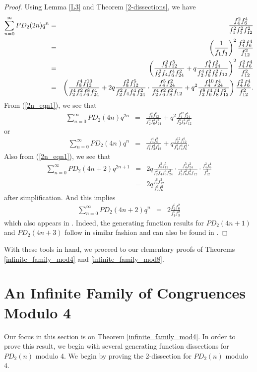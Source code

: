 \documentclass{amsart}
\begin{document}
\begin{proof}
Using Lemma \ref{L3} and Theorem \ref{2-dissections},  we have 
\begin{eqnarray}
\sum_{n=0}^{\infty} PD_2(2n)q^n
&=& 
\frac{f_4^2f_6^4}{f_1^2f_3^2f_{12}^2} \notag \\
&=& 
\left( \frac{1}{f_1f_3} \right)^2 \frac{f_4^2f_6^4}{f_{12}^2} \notag \\
&=& 
\left( \frac{f_8^2f_{12}^5}{f_2^2f_4f_6^4f_{24}^2} + q \frac{f_4^5f_{24}^2}{f_2^4f_6^2f_8^2f_{12}} \right)^2 \frac{f_4^2f_6^4}{f_{12}^2} \notag \\
&=& 
\left( \frac{f_8^4f_{12}^{10}}{f_2^4f_4^2f_6^8f_{24}^4} + 2q \frac{f_8^2f_{12}^5}{f_2^2f_4f_6^4f_{24}^2}\cdot \frac{f_4^5f_{24}^2}{f_2^4f_6^2f_8^2f_{12}} + q^2\frac{f_4^{10}f_{24}^4}{f_2^8f_6^4f_8^4f_{12}^2}\right) \frac{f_4^2f_6^4}{f_{12}^2}. \label{2n_eqn1} 
\end{eqnarray}
From (\ref{2n_eqn1}), we see that 
\begin{eqnarray*}
\sum_{n=0}^{\infty} PD_2(4n)q^{2n}
&=& 
 \frac{f_8^4f_{12}^{8}}{f_2^4f_6^4f_{24}^4}  + q^2\frac{f_4^{12}f_{24}^4}{f_2^8f_8^4f_{12}^4}
\end{eqnarray*}
or 
\begin{eqnarray*}
\sum_{n=0}^{\infty} PD_2(4n)q^{n}
&=& 
 \frac{f_4^4f_{6}^{8}}{f_1^4f_3^4f_{12}^4}  + q\frac{f_2^{12}f_{12}^4}{f_1^8f_4^4f_{6}^4}.
\end{eqnarray*}
Also from (\ref{2n_eqn1}), we see that 
\begin{eqnarray*}
\sum_{n=0}^{\infty} PD_2(4n+2)q^{2n+1}
&=& 
2q \frac{f_8^2f_{12}^5}{f_2^2f_4f_6^4f_{24}^2}\cdot \frac{f_4^5f_{24}^2}{f_2^4f_6^2f_8^2f_{12}}  \cdot \frac{f_4^2f_6^4}{f_{12}^2} \\
&=& 
2q \frac{f_4^6f_{12}^2}{f_2^6f_6^2}
\end{eqnarray*}
after simplification.  And this implies 
\begin{eqnarray*}
\sum_{n=0}^{\infty} PD_2(4n+2)q^{n}
&=& 
2\frac{f_2^6f_{6}^2}{f_1^6f_3^2}
\end{eqnarray*}
which also appears in \cite[Theorem 1.3]{BO}.  Indeed, the generating function results for $PD_2(4n+1)$ and $PD_2(4n+3)$ follow in similar fashion and can also be found in \cite[Theorem 1.3]{BO}.
\end{proof}
With these tools in hand, we proceed to our elementary proofs of Theorems \ref{infinite_family_mod4} and \ref{infinite_family_mod8}.

\section{An Infinite Family of Congruences Modulo 4}
Our focus in this section is on Theorem \ref{infinite_family_mod4}.  In order to prove this result, we begin with several generating function dissections for $PD_2(n)$ modulo 4.  
We begin by proving the 2-dissection for $PD_2(n)$ modulo 4.
\end{document}
